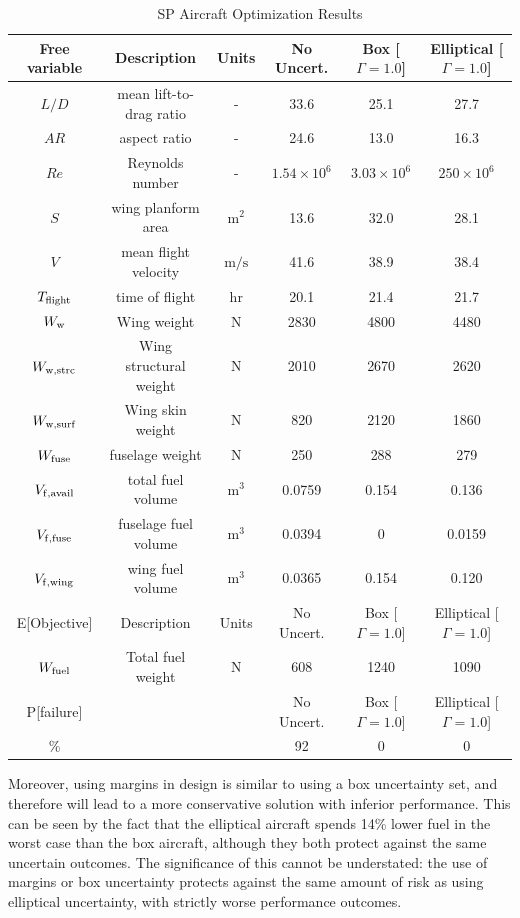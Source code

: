 \begin{table}[!h]
\begin{center}
\caption{\label{tab:results} SP Aircraft Optimization Results}
\begin{tabular}{c c c c c c}
\hline
Free variable & Description & Units & No Uncert. & Box [$\Gamma = 1.0$] & Elliptical [$\Gamma = 1.0$] \\
\hline
$L/D$ & mean lift-to-drag ratio & - & 33.6 & 25.1 & 27.7 \\
$AR$ & aspect ratio & - & 24.6 & 13.0 & 16.3 \\
$Re$ & Reynolds number & - & $1.54 \times 10^6$ & $3.03\times 10^6$ & $250 \times 10^6$ \\
$S$ & wing planform area &$\mathrm{m^2}$ & 13.6 & 32.0 & 28.1 \\
$V$ & mean flight velocity &$\mathrm{m/s}$ & 41.6 & 38.9 & 38.4 \\
$T_{\rm{flight}}$ & time of flight & $\mathrm{hr}$ & 20.1 & 21.4 & 21.7 \\
$W_{\rm{w}}$ & Wing weight & $\mathrm{N}$ & 2830 & 4800 & 4480 \\
$W_{\rm{w,strc}}$ & Wing structural weight &$\mathrm{N}$ & 2010 & 2670 & 2620 \\
$W_{\rm{w,surf}}$ & Wing skin weight &$\mathrm{N}$ & 820 & 2120 & 1860 \\
$W_{\rm{fuse}}$ & fuselage weight &$\mathrm{N}$ & 250 & 288 & 279 \\
$V_{\rm{f,avail}}$ & total fuel volume & $\mathrm{m^3}$ & 0.0759 & 0.154 & 0.136 \\
$V_{\rm{f,fuse}}$ & fuselage fuel volume & $\mathrm{m^3}$ & 0.0394 & 0 & 0.0159 \\
$V_{\rm{f,wing}}$ & wing fuel volume &$\mathrm{m^3}$ & 0.0365 & 0.154 & 0.120    \\
\hline
E[Objective] & Description & Units & No Uncert. & Box [$\Gamma = 1.0$] & Elliptical [$\Gamma = 1.0$] \\
\hline
$W_{\rm{fuel}}$ & Total fuel weight & $\mathrm{N}$ & 608 & 1240 & 1090 \\
\hline
P[failure] & & & No Uncert. & Box [$\Gamma = 1.0$] & Elliptical [$\Gamma = 1.0$] \\
\hline
\% & & & 92 & 0 & 0\\
\hline
\end{tabular}
\end{center}
\end{table}

Moreover, using margins in design is similar to using a box uncertainty set, and therefore will lead
to a more conservative solution with inferior performance. This can be seen by the fact that
the elliptical aircraft spends 14\% lower fuel in the worst case
than the box aircraft, although they both protect against the same uncertain outcomes.
The significance of this cannot be understated: the use of margins or box uncertainty protects
against the same amount of risk as using elliptical uncertainty, with strictly worse performance outcomes.

